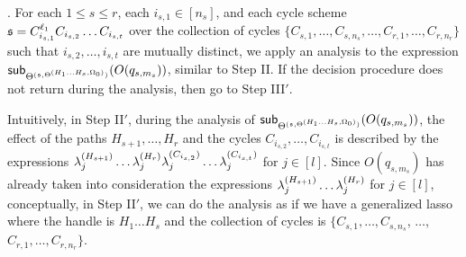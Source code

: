 \smallskip 
{}.  For each $1 \le s \le r$, each $i_{s,1}\in [n_s]$, and each cycle scheme $\schm = C^{\ell_1}_{i_{s,1}} C_{i_{s,2}} \dots C_{i_{s, t}}$ over the collection of cycles $\{C_{s, 1}, \dots, C_{s,n_s},\dots, C_{r,1}, \dots, C_{r,n_r}\}$ such that $i_{s,2},\dots, i_{s,t}$ are mutually distinct, we apply an analysis to the expression $\sub{ O(q_{s, m_{s}})} {\sumf^{(\schm,\sumf^{(H_1 \dots H_{s}, \initval_0)} ) } }$, similar to Step II. If the decision procedure does not return during the analysis, then go to Step III$'$.

\smallskip

Intuitively, in Step II$'$, during the analysis of $\sub{ O(q_{s, m_{s}})} {\sumf^{(\schm,\sumf^{(H_1 \dots H_{s}, \initval_0)} ) } }$, the effect of the paths $H_{s+1},  \dots,  H_r$ and the cycles $C_{i_{s,2}}, \dots, C_{i_{s, t}}$ is described by the expressions $\cstl^{(H_{s+1})}_j \dots \cstl^{(H_{r})}_j  \cstl^{(C_{i_{s,2}})}_j \dots \cstl^{(C_{i_{s,t}})}_j $ for $j \in [l]$. Since $O(q_{s, m_{s}})$ has already taken into consideration the expressions $\cstl^{(H_{s+1})}_j \dots \cstl^{(H_{r})}_j$ for $j \in [l]$, conceptually, in Step II$'$, we can do the analysis as if we have a generalized lasso where the handle is $H_1\dots H_s$ and the collection of cycles is $\{C_{s,1},\dots, C_{s,n_s}$, $\dots$, $C_{r,1},\dots, C_{r,n_r}\}$. 



